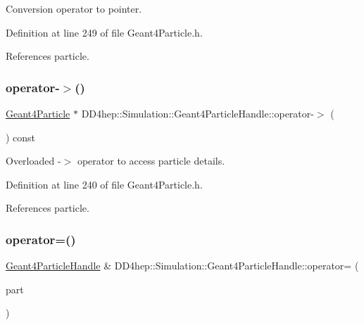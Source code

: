 Conversion operator to pointer. 



Definition at line 249 of file Geant4\+Particle.\+h.



References particle.

\hypertarget{class_d_d4hep_1_1_simulation_1_1_geant4_particle_handle_a2e94d6191b35b83662dba100a5b24b0d}{}\label{class_d_d4hep_1_1_simulation_1_1_geant4_particle_handle_a2e94d6191b35b83662dba100a5b24b0d} 
\subsubsection{\texorpdfstring{operator-\/$>$()}{operator->()}}
{\footnotesize\ttfamily \hyperlink{class_d_d4hep_1_1_simulation_1_1_geant4_particle}{Geant4\+Particle} $\ast$ D\+D4hep\+::\+Simulation\+::\+Geant4\+Particle\+Handle\+::operator-\/$>$ (\begin{DoxyParamCaption}{ }\end{DoxyParamCaption}) const\hspace{0.3cm}{\ttfamily [inline]}}



Overloaded -\/$>$ operator to access particle details. 



Definition at line 240 of file Geant4\+Particle.\+h.



References particle.

\hypertarget{class_d_d4hep_1_1_simulation_1_1_geant4_particle_handle_a127942c2338b44ef36f9f8eae2845b63}{}\label{class_d_d4hep_1_1_simulation_1_1_geant4_particle_handle_a127942c2338b44ef36f9f8eae2845b63} 
\subsubsection{\texorpdfstring{operator=()}{operator=()}}
{\footnotesize\ttfamily \hyperlink{class_d_d4hep_1_1_simulation_1_1_geant4_particle_handle}{Geant4\+Particle\+Handle} \& D\+D4hep\+::\+Simulation\+::\+Geant4\+Particle\+Handle\+::operator= (\begin{DoxyParamCaption}\item[{\hyperlink{class_d_d4hep_1_1_simulation_1_1_geant4_particle}{Geant4\+Particle} $\ast$}]{part }\end{DoxyParamCaption})\hspace{0.3cm}{\ttfamily [inline]}}




